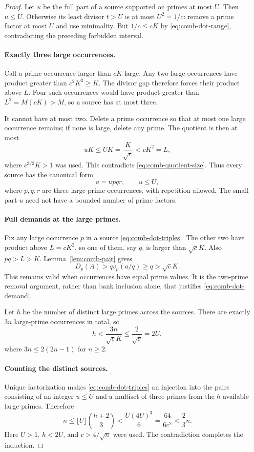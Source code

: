 \begin{proof}
Let $u$ be the full part of a source supported on primes at most
$U$. Then $u\le U$. Otherwise its least divisor $t>U$ is at most
$U^2=1/c$: remove a prime factor at most $U$ and use minimality.
But $1/c\le cK$ by \eqref{eq:comb-dot-range}, contradicting the
preceding forbidden interval.

\paragraph{Exactly three large occurrences.}
Call a prime occurrence larger than $cK$ large. Any two large
occurrences have product greater than $c^2K^2\ge K$. The divisor
gap therefore forces their product above $L$. Four such
occurrences would have product greater than
$L^2=M(cK)>M$, so a source has at most three.

It cannot have at most two. Delete a prime occurrence so that at
most one large occurrence remains; if none is large, delete any
prime. The quotient is then at most
\[
 uK\le UK=\frac K{\sqrt c}<cK^2=L,
\]
where $c^{3/2}K>1$ was used. This contradicts
\eqref{eq:comb-quotient-size}. Thus every source has the canonical
form
\begin{equation}
 a=u p q r,\qquad u\le U,
 \label{eq:comb-dot-triples}
\end{equation}
where $p,q,r$ are three large prime occurrences, with repetition
allowed. The small part $u$ need not have a bounded number of
prime factors.

\paragraph{Full demands at the large primes.}
Fix any large occurrence $p$ in a source
\eqref{eq:comb-dot-triples}. The other two have product above
$L=cK^2$, so one of them, say $q$, is larger than $\sqrt cK$.
Also $pq>L>K$. Lemma~\ref{lem:comb-pair} gives
\begin{equation}
 D_p(A)>qv_p(a/q)\ge q>\sqrt cK.
 \label{eq:comb-dot-demand}
\end{equation}
This remains valid when occurrences have equal prime values.
It is the two-prime removal argument, rather than bank inclusion
alone, that justifies \eqref{eq:comb-dot-demand}.

Let $h$ be the number of distinct large primes across the sources.
There are exactly $3n$ large-prime occurrences in total, so
\[
 h<\frac{3n}{\sqrt cK}\le\frac2{\sqrt c}=2U,
\]
where $3n\le2(2n-1)$ for $n\ge2$.

\paragraph{Counting the distinct sources.}
Unique factorization makes \eqref{eq:comb-dot-triples} an injection
into the pairs consisting of an integer $u\le U$ and a multiset
of three primes from the $h$ available large primes. Therefore
\[
 n\le\lfloor U\rfloor\binom{h+2}{3}
   <\frac{U(4U)^3}{6}
   =\frac{64}{6c^2}
   <\frac23n.
\]
Here $U>1$, $h<2U$, and $c>4/\sqrt n$ were used. The contradiction
completes the induction.
\end{proof}

